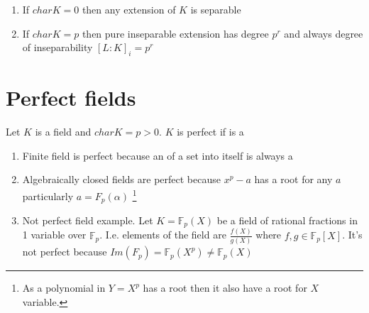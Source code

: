 \begin{remark}
  \begin{enumerate}
  \item If $char K = 0$ then any extension of $K$ is separable
  \item If $char K = p$ then pure inseparable extension has degree
    $p^r$ and always degree of inseparability
    $\left[L:K\right]_i = p^r$
  \end{enumerate}
\end{remark}

\section{Perfect fields}

\begin{definition}
  Let $K$ is a field and $char K = p > 0$. $K$ is perfect if
   is a 
  \label{def:perfectfield}
\end{definition}

\begin{example}
  \begin{enumerate}
    \item Finite field is perfect because an 
      of a set into itself is always a 
    \item Algebraically closed fields are perfect because
      $x^p - a$ has a root for any $a$ particularly
      $a = F_p\left(\alpha\right)$
      \footnote{
        As a polynomial in $Y=X^p$ has a root then it also have a root
        for $X$ variable.
      }
    \item Not perfect field example. Let
      $K=\mathbb{F}_p\left(X\right)$ be a field of rational fractions
      in 1 variable over $\mathbb{F}_p$. I.e. elements of the field
      are $\frac{f(X)}{g(X)}$ where
      $f,g \in \mathbb{F}_p\left[X\right]$. It's not perfect because
      $Im\left(F_p\right) = \mathbb{F}_p\left(X^p\right) \ne
      \mathbb{F}_p\left(X\right)$ 
  \end{enumerate}
\end{example}

